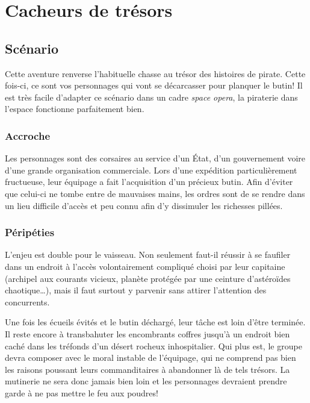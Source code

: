 \chapter{Cacheurs de trésors}

\section{Scénario}

Cette aventure renverse l'habituelle chasse au trésor des histoires de pirate.
Cette fois-ci, ce sont vos personnages qui vont se décarcasser pour planquer le butin!
Il est très facile d'adapter ce scénario dans un cadre \emph{space opera}, la piraterie dans l'espace fonctionne parfaitement bien.

\subsection{Accroche}

Les personnages sont des corsaires au service d'un État, d'un gouvernement voire d'une grande organisation commerciale.
Lors d'une expédition particulièrement fructueuse, leur équipage a fait l'acquisition d'un précieux butin.
Afin d'éviter que celui-ci ne tombe entre de mauvaises mains, les ordres sont de se rendre dans un lieu difficile d'accès et peu connu afin d'y dissimuler les richesses pillées.

\subsection{Péripéties}

L'enjeu est double pour le vaisseau. Non seulement faut-il réussir à se faufiler dans un endroit à l'accès volontairement compliqué choisi par leur capitaine (archipel aux courants vicieux, planète protégée par une ceinture d'astéroïdes chaotique\dots), mais il faut surtout y parvenir sans attirer l'attention des concurrents.

Une fois les écueils évités et le butin déchargé, leur tâche est loin d'être terminée.
Il reste encore à transbahuter les encombrants coffres jusqu'à un endroit bien caché dans les tréfonds d'un désert rocheux inhospitalier.
Qui plus est, le groupe devra composer avec le moral instable de l'équipage, qui ne comprend pas bien les raisons poussant leurs commanditaires à abandonner là de tels trésors.
La mutinerie ne sera donc jamais bien loin et les personnages devraient prendre garde à ne pas mettre le feu aux poudres!

